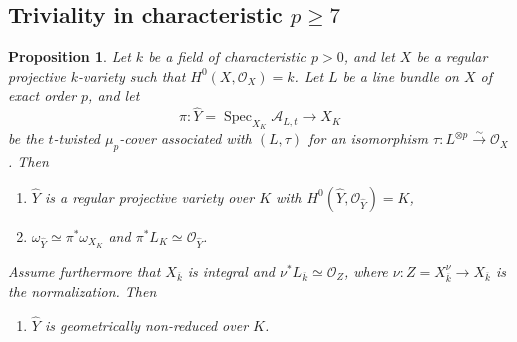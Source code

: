 \documentclass[10pt,abstract=true]{scrartcl}
\numberwithin{equation}{section}
\newtheorem{proposition}[theorem]{Proposition}
\theoremstyle{definition}
\theoremstyle{remark}
\begin{document}
\subsection{Triviality in characteristic \texorpdfstring{$p\ge7$}{p >= 7}}\label{sec:triviality-p-ge7}%
\begin{proposition}
  \label{prop:generically-twisted-mu-p-cover}
  Let $k$ be a field of characteristic $p>0$, and let $X$ be a regular projective $k$-variety such that $H^0(X,\mathcal O_X)=k$.
  Let $L$ be a line bundle on $X$ of exact order $p$, and let
  \[
    \pi\colon \widehat Y
      =\operatorname{Spec}_{X_K}\mathcal A_{L,t}\longrightarrow X_K
  \]
  be the $t$-twisted $\mu_p$-cover associated with $(L,\tau)$ for an isomorphism $\tau\colon L^{\otimes p}\xrightarrow{\sim}\mathcal O_X$.
  Then
  \begin{enumerate}[label=\textup{(\arabic*)}]
    \item $\widehat Y$ is a regular projective variety over $K$ with $H^0(\widehat Y,\mathcal O_{\widehat Y})=K$,
    \item $\omega_{\widehat Y}\simeq\pi^*\omega_{X_K}$ and $\pi^*L_K\simeq\mathcal O_{\widehat Y}$.
  \end{enumerate}
  Assume furthermore that $X_{\overline{k}}$ is integral and $\nu^*L_{\overline{k}}\simeq\mathcal O_Z$, where $\nu\colon Z=X_{\overline{k}}^\nu\to X_{\overline{k}}$ is the normalization.
  Then
  \begin{enumerate}[label=\textup{(\arabic*)},resume]
    \item $\widehat Y$ is geometrically non-reduced over $K$.
  \end{enumerate}
\end{proposition}
\end{document}
